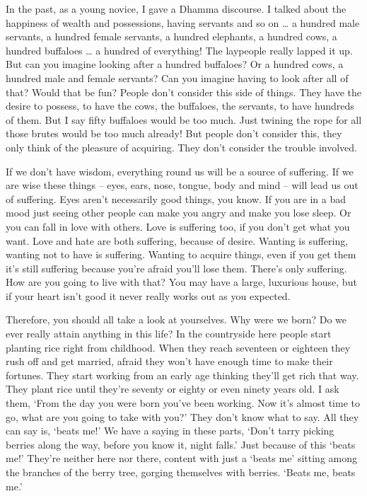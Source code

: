 In the past, as a young novice, I gave a Dhamma discourse. I talked about the happiness of wealth and possessions, having servants and so on \ldots{} a hundred male servants, a hundred female servants, a hundred elephants, a hundred cows, a hundred buffaloes \ldots{} a hundred of everything! The laypeople really lapped it up. But can you imagine looking after a hundred buffaloes? Or a hundred cows, a hundred male and female servants? Can you imagine having to look after all of that? Would that be fun? People don't consider this side of things. They have the desire to possess, to have the cows, the buffaloes, the servants, to have hundreds of them. But I say fifty buffaloes would be too much. Just twining the rope for all those brutes would be too much already! But people don't consider this, they only think of the pleasure of acquiring. They don't consider the trouble involved. 

If we don't have wisdom, everything round us will be a source of suffering. If we are wise these things -- eyes, ears, nose, tongue, body and mind -- will lead us out of suffering. Eyes aren't necessarily good things, you know. If you are in a bad mood just seeing other people can make you angry and make you lose sleep. Or you can fall in love with others. Love is suffering too, if you don't get what you want. Love and hate are both suffering, because of desire. Wanting is suffering, wanting not to have is suffering. Wanting to acquire things, even if you get them it's still suffering because you're afraid you'll lose them. There's only suffering. How are you going to live with that? You may have a large, luxurious house, but if your heart isn't good it never really works out as you expected. 

Therefore, you should all take a look at yourselves. Why were we born? Do we ever really attain anything in this life? In the countryside here people start planting rice right from childhood. When they reach seventeen or eighteen they rush off and get married, afraid they won't have enough time to make their fortunes. They start working from an early age thinking they'll get rich that way. They plant rice until they're seventy or eighty or even ninety years old. I ask them, `From the day you were born you've been working. Now it's almost time to go, what are you going to take with you?' They don't know what to say. All they can say is, `beats me!' We have a saying in these parts, `Don't tarry picking berries along the way, before you know it, night falls.' Just because of this `beats me!' They're neither here nor there, content with just a `beats me' sitting among the branches of the berry tree, gorging themselves with berries. `Beats me, beats me.' 

